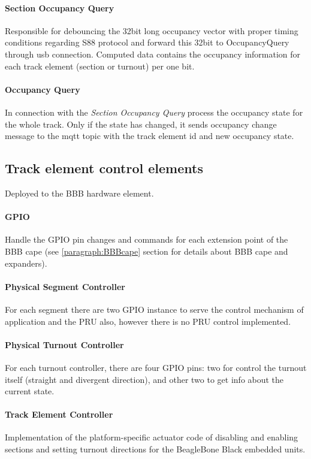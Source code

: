 \paragraph{Section Occupancy Query}
Responsible for debouncing the 32bit long occupancy vector with proper timing conditions regarding S88 protocol and forward this 32bit to OccupancyQuery through usb connection. Computed data contains the occupancy information for each track element (section or turnout) per one bit.
\paragraph{Occupancy Query}
In connection with the \textit{Section Occupancy Query} process the occupancy state for the whole track. Only if the state has changed, it sends occupancy change message to the mqtt topic with the track element id and new occupancy state.

\subsection{Track element control elements}
Deployed to the BBB hardware element.
\paragraph{GPIO}
Handle the GPIO pin changes and commands for each extension point of the BBB cape (see \ref{paragraph:BBBcape} section for details about BBB cape and expanders).
\paragraph{Physical Segment Controller}
For each segment there are two GPIO instance to serve the control mechanism of application and the PRU also, however there is no PRU control implemented.
\paragraph{Physical Turnout Controller}
For each turnout controller, there are four GPIO pins: two for control the turnout itself (straight and divergent direction), and other two to get info about the current state.
\paragraph{Track Element Controller}
Implementation of the platform-specific actuator code of disabling and enabling sections and setting turnout directions for the BeagleBone Black embedded units.

